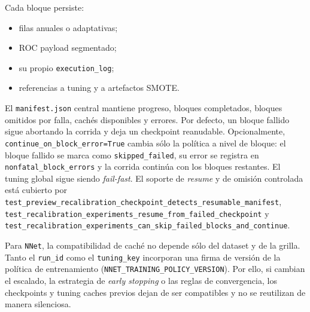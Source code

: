 Cada bloque persiste:
\begin{itemize}[leftmargin=*]
  \item filas anuales o adaptativas;
  \item ROC payload segmentado;
  \item su propio \texttt{execution\_log};
  \item referencias a tuning y a artefactos SMOTE.
\end{itemize}
El \texttt{manifest.json} central mantiene progreso, bloques completados, bloques omitidos por falla, cach\'es disponibles y errores. Por defecto, un bloque fallido sigue abortando la corrida y deja un checkpoint reanudable. Opcionalmente, \texttt{continue\_on\_block\_error=True} cambia s\'olo la pol\'itica a nivel de bloque: el bloque fallido se marca como \texttt{skipped\_failed}, su error se registra en \texttt{nonfatal\_block\_errors} y la corrida contin\'ua con los bloques restantes. El tuning global sigue siendo \textit{fail-fast}. El soporte de \textit{resume} y de omisi\'on controlada est\'a cubierto por \texttt{test\_preview\_recalibration\_checkpoint\_detects\_resumable\_manifest}, \texttt{test\_recalibration\_experiments\_resume\_from\_failed\_checkpoint} y \texttt{test\_recalibration\_experiments\_can\_skip\_failed\_blocks\_and\_continue}.

Para \texttt{NNet}, la compatibilidad de cach\'e no depende s\'olo del dataset y de la grilla. Tanto el \texttt{run\_id} como el \texttt{tuning\_key} incorporan una firma de versi\'on de la pol\'itica de entrenamiento (\texttt{NNET\_TRAINING\_POLICY\_VERSION}). Por ello, si cambian el escalado, la estrategia de \textit{early stopping} o las reglas de convergencia, los checkpoints y tuning caches previos dejan de ser compatibles y no se reutilizan de manera silenciosa.

